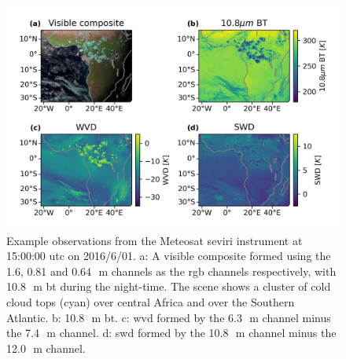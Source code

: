 \begin{figure}[tp]
    \includegraphics[width=\textwidth]{figures/chapter4_01.png}
    \caption[
    Example observations from the Meteosat \acrshort{seviri} instrument at 15:00:00 \acrshort{utc} on 2016/6/01
    ]{
    Example observations from the Meteosat \acrshort{seviri} instrument at 15:00:00 \acrshort{utc} on 2016/6/01. a: A visible composite formed using the 1.6, 0.81 and 0.64\,\unit{\mu m} channels as the \acrshort{rgb} channels respectively, with 10.8\,\unit{\mu m} \acrshort{bt} during the night-time. The scene shows a cluster of cold cloud tops (cyan) over central Africa and over the Southern Atlantic. b: 10.8\,\unit{\mu m} \acrshort{bt}. c: \acrshort{wvd} formed by the 6.3\,\unit{\mu m} channel minus the 7.4\,\unit{\mu m} channel. d: \acrshort{swd} formed by the 10.8\,\unit{\mu m} channel minus the 12.0\,\unit{\mu m} channel.
    }
    \label{fig:seviri_obs_example}
\end{figure}


